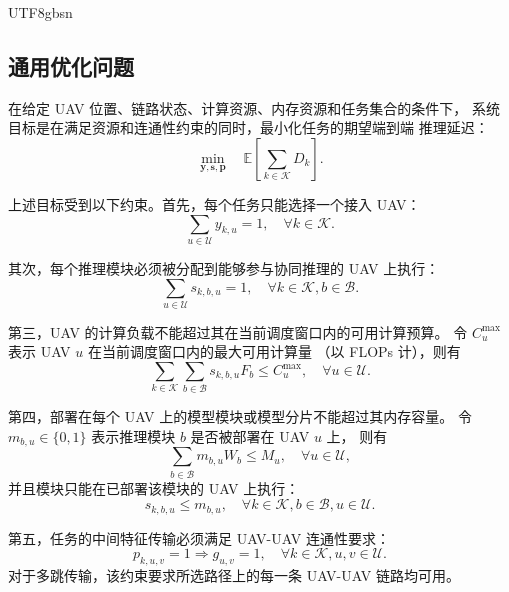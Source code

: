 \documentclass[conference]{IEEEtran}
\begin{document}
\begin{CJK*}{UTF8}{gbsn}
\subsection{通用优化问题}

在给定 UAV 位置、链路状态、计算资源、内存资源和任务集合的条件下，
系统目标是在满足资源和连通性约束的同时，最小化任务的期望端到端
推理延迟：
\begin{equation}
\min_{\mathbf{y},\mathbf{s},\mathbf{p}}
\quad
\mathbb{E}\left[\sum_{k\in\mathcal{K}} D_k\right].
\end{equation}

上述目标受到以下约束。首先，每个任务只能选择一个接入 UAV：
\begin{equation}
\sum_{u\in\mathcal{U}} y_{k,u}=1,\quad \forall k\in\mathcal{K}.
\end{equation}

其次，每个推理模块必须被分配到能够参与协同推理的 UAV 上执行：
\begin{equation}
\sum_{u\in\mathcal{U}} s_{k,b,u}=1,\quad
\forall k\in\mathcal{K}, b\in\mathcal{B}.
\end{equation}

第三，UAV 的计算负载不能超过其在当前调度窗口内的可用计算预算。
令 $C_u^{\max}$ 表示 UAV $u$ 在当前调度窗口内的最大可用计算量
（以 FLOPs 计），则有
\begin{equation}
\sum_{k\in\mathcal{K}}\sum_{b\in\mathcal{B}}
s_{k,b,u}F_b \le C_u^{\max},\quad \forall u\in\mathcal{U}.
\end{equation}

第四，部署在每个 UAV 上的模型模块或模型分片不能超过其内存容量。
令 $m_{b,u}\in\{0,1\}$ 表示推理模块 $b$ 是否被部署在 UAV $u$ 上，
则有
\begin{equation}
\sum_{b\in\mathcal{B}} m_{b,u}W_b \le M_u,\quad
\forall u\in\mathcal{U},
\end{equation}
并且模块只能在已部署该模块的 UAV 上执行：
\begin{equation}
s_{k,b,u}\le m_{b,u},\quad
\forall k\in\mathcal{K}, b\in\mathcal{B}, u\in\mathcal{U}.
\end{equation}

第五，任务的中间特征传输必须满足 UAV-UAV 连通性要求：
\begin{equation}
p_{k,u,v}=1 \Rightarrow g_{u,v}=1,\quad
\forall k\in\mathcal{K}, u,v\in\mathcal{U}.
\end{equation}
对于多跳传输，该约束要求所选路径上的每一条 UAV-UAV 链路均可用。


\end{CJK*}
\end{document}
